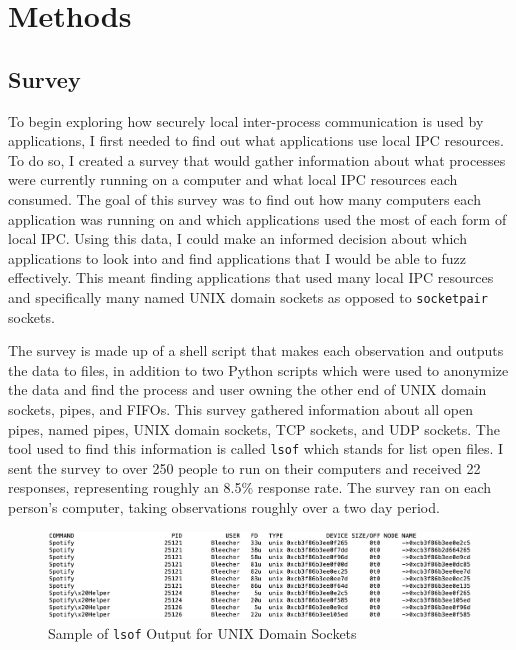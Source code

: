 \chapter{Methods}
\label{sec:methods}

\section{Survey}
\label{sec:survey}
To begin exploring how securely local inter-process communication is used by applications, I first needed to find out what applications use local IPC resources.  To do so, I created a survey that would gather information about what processes were currently running on a computer and what local IPC resources each consumed.  The goal of this survey was to find out how many computers each application was running on and which applications used the most of each form of local IPC.  Using this data, I could make an informed decision about which applications to look into and find applications that I would be able to fuzz effectively.  This meant finding applications that used many local IPC resources and specifically many named UNIX domain sockets as opposed to \texttt{socketpair} sockets.

The survey is made up of a shell script that makes each observation and outputs the data to files, in addition to two Python scripts which were used to anonymize the data and find the process and user owning the other end of UNIX domain sockets, pipes, and FIFOs.  This survey gathered information about all open pipes, named pipes, UNIX domain sockets, TCP sockets, and UDP sockets.  The tool used to find this information is called \texttt{lsof} which stands for list open files.  I sent the survey to over 250 people to run on their computers and received 22 responses, representing roughly an 8.5\% response rate.  The survey ran on each person's computer, taking observations roughly over a two day period.  

\begin{figure}
\centering
\includegraphics[width=1\textwidth]{lsofOutput.png}
\caption{Sample of \texttt{lsof} Output for UNIX Domain Sockets}
\label{fig:lsofOutput}
\end{figure}

